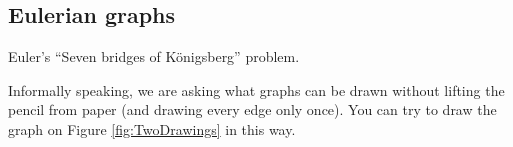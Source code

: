 

\setcounter{section}{1}
\setcounter{subsection}{6}
\setcounter{dfn}{18}

\subsection{Eulerian graphs}
Euler's ``Seven bridges of K\"onigsberg'' problem.

Informally speaking, we are asking what graphs can be drawn without lifting the pencil from paper
(and drawing every edge only once).
You can try to draw the graph on Figure \ref{fig:TwoDrawings} in this way.


